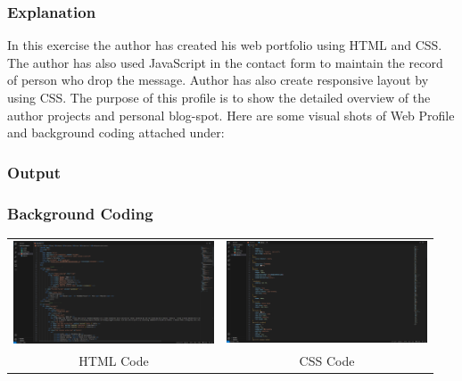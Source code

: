 \documentclass[12pt, A4]{report}
\begin{document}
\subsubsection{Explanation}
In this exercise the author has created his web portfolio using HTML and CSS. The author has also used JavaScript in the contact form to maintain the record of person who drop the message. Author has also create responsive layout by using CSS. The purpose of this profile is to show the detailed overview of the author projects and personal blog-spot. Here are some visual shots of Web Profile and background coding attached under:
\subsubsection{Output}
\subsubsection{Background Coding}
\begin{tabular}{cc}
  \includegraphics[width=225,height=0.20\textheight]{HTML Code.png}
  &
  \includegraphics[width=225,height=0.20\textheight]{CSS Code.png}
 \\
  HTML Code & CSS Code
\end{tabular}
\end{document}
